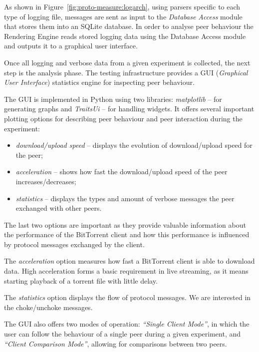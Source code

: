 As shown in Figure~\ref{fig:proto-measure:logarch}, using parsers specific to
each type of logging file, messages are sent as input to the \textit{Database
Access} module that stores them into an SQLite database. In order to analyse
peer behaviour the Rendering Engine reads stored logging data using the
Database Access module and outputs it to a graphical user interface.

Once all logging and verbose data from a given experiment is collected, the
next step is the analysis phase. The testing infrastructure provides a GUI
(\textit{Graphical User Interface}) statistics engine for inspecting peer
behaviour. 

The GUI is implemented in Python using two libraries: \textit{matplotlib}
-- for generating graphs and \textit{TraitsUi} -- for handling widgets. It
offers several important plotting options for describing peer behaviour and
peer interaction during the experiment:

\begin{itemize}
  \item \textit{download/upload speed} -- displays the evolution of
download/upload speed for the peer;
  \item \textit{acceleration} -- shows how fast the download/upload speed of
the peer increases/decreases;
  \item \textit{statistics} -- displays the types and amount of verbose
messages the peer exchanged with other peers.
\end{itemize}

The last two options are important as they provide valuable information about
the performance of the BitTorrent client and how this performance is
influenced by protocol messages exchanged by the client.


The \textit{acceleration} option measures how fast a BitTorrent client is able
to download data. High acceleration forms a basic requirement in live
streaming, as it means starting playback of a torrent file with little delay.

The \textit{statistics} option displays the flow of protocol messages. We are
interested in the choke/unchoke messages.

The GUI also offers two modes of operation: \textit{``Single Client Mode''},
in which the user can follow the behaviour of a single peer during a given
experiment, and \textit{``Client Comparison Mode''}, allowing for comparisons
between two peers.

